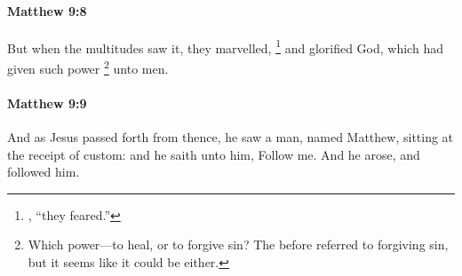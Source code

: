 		\paragraph{Matthew 9:8} %
			\label{MATTHEW-9-8}

			But when the multitudes saw it, they marvelled,%
				\footnote{%
					, ``they feared.'' 
					} 
			and glorified God, which had given such power%
				\footnote{%
					Which power---to heal, or to forgive sin? The  before referred to forgiving sin, but it seems like it could be either.
					}
			unto men.

			\begin{framed}
			\scriptsize
				\begin{compactdesc}
					\item[SBLG]  \hyperref[EXOUSIA]{} 
				\end{compactdesc}
			\end{framed}

		\paragraph{Matthew 9:9} %
			\label{MATTHEW-9-9}

			And as Jesus passed forth from thence, he saw a man, named Matthew, sitting at the receipt of custom: and he saith unto him, Follow me. And he arose, and followed him.

